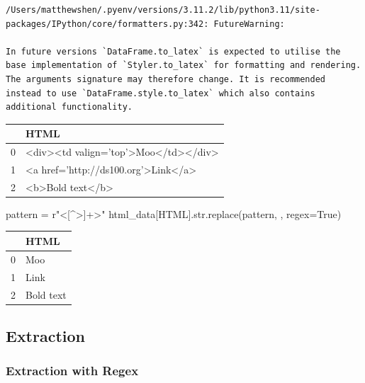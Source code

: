 \documentclass[
  letterpaper,
  DIV=11,
  numbers=noendperiod]{scrreprt}
\newenvironment{Shaded}{\begin{snugshade}}{\end{snugshade}}
\newcommand{\BuiltInTok}[1]{\textcolor[rgb]{0.00,0.23,0.31}{#1}}
\newcommand{\NormalTok}[1]{\textcolor[rgb]{0.00,0.23,0.31}{#1}}
\newcommand{\OperatorTok}[1]{\textcolor[rgb]{0.37,0.37,0.37}{#1}}
\newcommand{\StringTok}[1]{\textcolor[rgb]{0.13,0.47,0.30}{#1}}
\newcommand{\VariableTok}[1]{\textcolor[rgb]{0.07,0.07,0.07}{#1}}
\newcommand{\VerbatimStringTok}[1]{\textcolor[rgb]{0.13,0.47,0.30}{#1}}
\begin{document}
\begin{verbatim}
/Users/matthewshen/.pyenv/versions/3.11.2/lib/python3.11/site-packages/IPython/core/formatters.py:342: FutureWarning:

In future versions `DataFrame.to_latex` is expected to utilise the base implementation of `Styler.to_latex` for formatting and rendering. The arguments signature may therefore change. It is recommended instead to use `DataFrame.style.to_latex` which also contains additional functionality.
\end{verbatim}

\begin{tabular}{ll}
\toprule
{} &                                  HTML \\
\midrule
0 &  <div><td valign='top'>Moo</td></div> \\
1 &   <a href='http://ds100.org'>Link</a> \\
2 &                      <b>Bold text</b> \\
\bottomrule
\end{tabular}

\begin{Shaded}
\begin{Highlighting}[]
\NormalTok{pattern }\OperatorTok{=} \VerbatimStringTok{r"\textless{}[\^{}\textgreater{}]+\textgreater{}"}
\NormalTok{html\_data[}\StringTok{\textquotesingle{}HTML\textquotesingle{}}\NormalTok{].}\BuiltInTok{str}\NormalTok{.replace(pattern, }\StringTok{\textquotesingle{}\textquotesingle{}}\NormalTok{, regex}\OperatorTok{=}\VariableTok{True}\NormalTok{)}
\end{Highlighting}
\end{Shaded}

\begin{tabular}{ll}
\toprule
{} &       HTML \\
\midrule
0 &        Moo \\
1 &       Link \\
2 &  Bold text \\
\bottomrule
\end{tabular}

\hypertarget{extraction-1}{%
\subsection{Extraction}\label{extraction-1}}

\hypertarget{extraction-with-regex}{%
\subsubsection{Extraction with Regex}\label{extraction-with-regex}}
\end{document}
